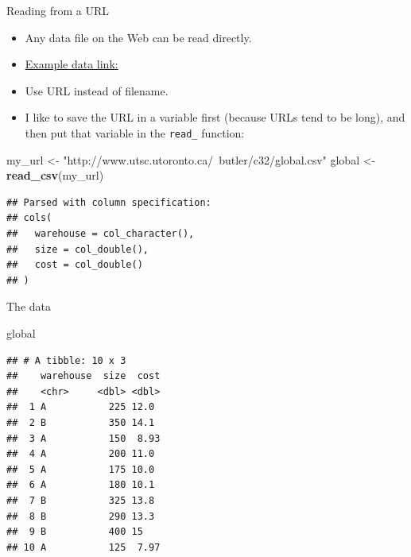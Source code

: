 \documentclass[ignorenonframetext,]{beamer}
\newenvironment{Shaded}{\begin{snugshade}}{\end{snugshade}}
\newcommand{\KeywordTok}[1]{\textcolor[rgb]{0.13,0.29,0.53}{\textbf{#1}}}
\newcommand{\NormalTok}[1]{#1}
\newcommand{\StringTok}[1]{\textcolor[rgb]{0.31,0.60,0.02}{#1}}
\providecommand{\tightlist}{%
  \setlength{\itemsep}{0pt}\setlength{\parskip}{0pt}}
\begin{document}
\begin{frame}[fragile]{Reading from a URL}
\protect\hypertarget{reading-from-a-url}{}

\begin{itemize}
\tightlist
\item
  Any data file on the Web can be read directly.
\item
  \href{http://www.utsc.utoronto.ca/~butler/c32/global.csv}{Example data
  link:}
\item
  Use URL instead of filename.
\item
  I like to save the URL in a variable first (because URLs tend to be
  long), and then put that variable in the \texttt{read\_} function:
\end{itemize}

\small

\begin{Shaded}
\begin{Highlighting}[]
\NormalTok{my_url <-}\StringTok{ "http://www.utsc.utoronto.ca/~butler/c32/global.csv"}
\NormalTok{global <-}\StringTok{ }\KeywordTok{read_csv}\NormalTok{(my_url)}
\end{Highlighting}
\end{Shaded}

\begin{verbatim}
## Parsed with column specification:
## cols(
##   warehouse = col_character(),
##   size = col_double(),
##   cost = col_double()
## )
\end{verbatim}

\normalsize

\end{frame}

\begin{frame}[fragile]{The data}
\protect\hypertarget{the-data}{}

\begin{Shaded}
\begin{Highlighting}[]
\NormalTok{global}
\end{Highlighting}
\end{Shaded}

\begin{verbatim}
## # A tibble: 10 x 3
##    warehouse  size  cost
##    <chr>     <dbl> <dbl>
##  1 A           225 12.0 
##  2 B           350 14.1 
##  3 A           150  8.93
##  4 A           200 11.0 
##  5 A           175 10.0 
##  6 A           180 10.1 
##  7 B           325 13.8 
##  8 B           290 13.3 
##  9 B           400 15   
## 10 A           125  7.97
\end{verbatim}

\end{frame}
\end{document}
